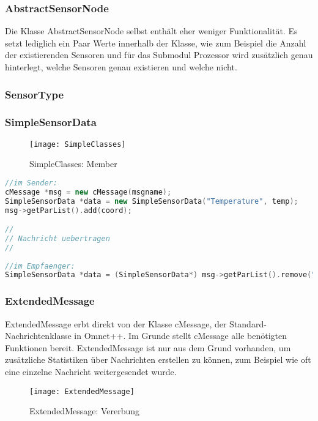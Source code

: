 \subsubsection{AbstractSensorNode}

Die Klasse AbstractSensorNode selbst enthält eher weniger Funktionalität. Es setzt lediglich ein Paar Werte innerhalb der Klasse, wie zum Beispiel die Anzahl der existierenden Sensoren und für das Submodul Prozessor wird zusätzlich genau hinterlegt, welche Sensoren genau existieren und welche nicht.

\subsubsection{SensorType}

\subsubsection{SimpleSensorData}

\begin{figure}[htbp]
\centering
\caption{SimpleClasses: Member}
\texttt{[image: SimpleClasses]}
\end{figure}

\begin{lstlisting}[language=C++, label=lst:SimpleExample]
//im Sender:
cMessage *msg = new cMessage(msgname);
SimpleSensorData *data = new SimpleSensorData("Temperature", temp);
msg->getParList().add(coord);

//
// Nachricht uebertragen    
//  
  
//im Empfaenger:  
SimpleSensorData *data = (SimpleSensorData*) msg->getParList().remove("Temperature");
\end{lstlisting}

\subsubsection{ExtendedMessage}

ExtendedMessage erbt direkt von der Klasse cMessage, der Standard-Nachrichtenklasse in Omnet++. Im Grunde stellt cMessage alle benötigten Funktionen bereit. ExtendedMessage ist nur aus dem Grund vorhanden, um zusätzliche Statistiken über Nachrichten erstellen zu können, zum Beispiel wie oft eine einzelne Nachricht weitergesendet wurde.

\begin{figure}[htbp]
\centering
\caption{ExtendedMessage: Vererbung}
\texttt{[image: ExtendedMessage]}
\end{figure}

